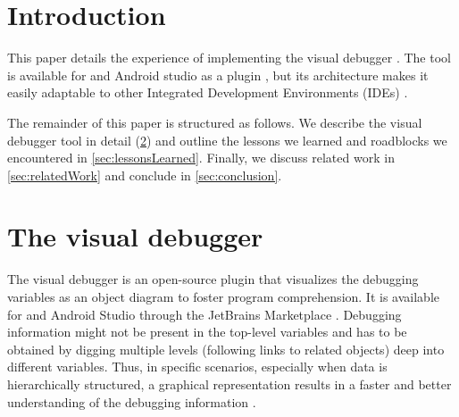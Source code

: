 \documentclass[sigconf]{acmart}
\begin{document}

\maketitle

\section{Introduction}
This paper details the experience of implementing the visual debugger \cite{krauterVisualDebuggerTool2022}.
The tool is available for \intellij{} and Android studio as a plugin \cite{timkrauterVisualDebuggerIntelliJ2023}, but its architecture makes it easily adaptable to other Integrated Development Environments (IDEs) \cite{krauterVisualDebuggerTool2022}.


The remainder of this paper is structured as follows.
We describe the visual debugger tool in detail (\cref{sec:visualDebugger}) and outline the lessons we learned and roadblocks we encountered in \cref{sec:lessonsLearned}.
Finally, we discuss related work in \cref{sec:relatedWork} and conclude in \cref{sec:conclusion}.


\section{The visual debugger} \label{sec:visualDebugger}
The visual debugger is an open-source \intellij{} plugin that visualizes the debugging variables as an object diagram to foster program comprehension.
It is available for \intellij{} and Android Studio through the JetBrains Marketplace \cite{timkrauterVisualDebuggerIntelliJ2023, timkrauterVisualDebuggerTool2023}.
Debugging information might not be present in the top-level variables and has to be obtained by digging multiple levels (following links to related objects) deep into different variables.
Thus, in specific scenarios, especially when data is hierarchically structured, a graphical representation results in a faster and better understanding of the debugging information \cite{krauterVisualDebuggerTool2022}.
\end{document}
